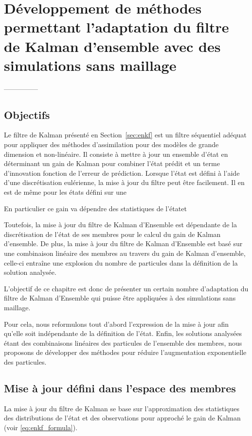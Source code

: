 \chapter{Développement de méthodes permettant l'adaptation du filtre de Kalman d'ensemble avec des simulations sans maillage}

---------------
\section{Objectifs}
Le filtre de Kalman présenté en Section~\ref*{sec:enkf} est un filtre séquentiel adéquat pour appliquer des méthodes d'assimilation pour des modèles de grande dimension et non-linéaire. Il consiste à mettre à jour un ensemble d'état en déterminant un gain de Kalman pour combiner l'état prédit et un terme d'innovation fonction de l'erreur de prédiction. Lorsque l'état est défini à l'aide d'une discrétisation eulérienne, la mise à jour du filtre peut être facilement. Il en est de même pour les états défini sur une

%
%

En particulier ce gain va dépendre des statistiques de l'étatet

Toutefois, la mise à jour du filtre de Kalman d'Ensemble est dépendante de la discrétisation de l'état de ses membres pour le calcul du gain de Kalman d'ensemble. De plus, la mise à jour du filtre de Kalman d'Ensemble est basé sur une combinaison linéaire des membres au travers du gain de Kalman d'ensemble, celle-ci entraîne une explosion du nombre de particules dans la définition de la solution analysée.

L'objectif de ce chapitre est donc de présenter un certain nombre d'adaptation du filtre de Kalman d'Ensemble qui puisse être appliquées à des simulations sans maillage.

Pour cela, nous reformulons tout d'abord l'expression de la mise à jour afin qu'elle soit indépendante de la définition de l'état.
Enfin, les solutions analysées étant des combinaisons linéaires des particules de l'ensemble des membres, nous proposons de développer des méthodes pour réduire l'augmentation exponentielle des particules.

\section{Mise à jour défini dans l'espace des membres}

La mise à jour du filtre de Kalman se base sur l'approximation des statistiques des distributions de l'état et des observations pour approché le gain de Kalman (voir \eqref{eq:enkf_formula}).

